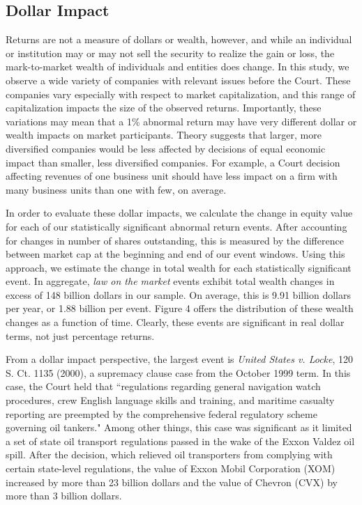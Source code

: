 \documentclass[preprint,12pt]{elsarticle}
\begin{document}
\subsection{Dollar Impact}
Returns are not a measure of dollars or wealth, however, and while an individual or institution may or may not sell the security to realize the gain or loss, the mark-to-market wealth of individuals and entities does change.  In this study, we observe a wide variety of companies with relevant issues before the Court. These companies vary especially with respect to market capitalization, and this range of capitalization impacts the size of the observed returns.  Importantly, these variations may mean that a 1\% abnormal return may have very different dollar or wealth impacts on market participants.  Theory suggests that larger, more diversified companies would be less affected by decisions of equal economic impact than smaller, less diversified companies.  For example, a Court decision affecting revenues of one business unit should have less impact on a firm with many business units than one with few, on average.  

In order to evaluate these dollar impacts, we calculate the change in equity value for each of our statistically significant abnormal return events.  After accounting for changes in number of shares outstanding, this is measured by the difference between market cap at the beginning and end of our event windows.  Using this approach, we estimate the change in total wealth for each statistically significant event. In aggregate, \textit{law on the market} events exhibit total wealth changes in excess of 148 billion dollars in our sample.  On average, this is 9.91 billion dollars per year, or 1.88 billion per event.  Figure 4 offers the distribution of these wealth changes as a function of time.  Clearly, these events are significant in real dollar terms, not just percentage returns.

From a dollar impact perspective, the largest event is \textit{United States v. Locke}, 120 S. Ct. 1135 (2000), a supremacy clause case from the October 1999 term.  In this case, the Court held that ``regulations regarding general navigation watch procedures, crew English language skills and training, and maritime casualty reporting are preempted by the comprehensive federal regulatory scheme governing oil tankers." Among other things, this case was significant as it limited a set of state oil transport regulations passed in the wake of the Exxon Valdez oil spill. After the decision, which relieved oil transporters from complying with certain state-level regulations,  the value of Exxon Mobil Corporation (XOM) increased by more than 23 billion dollars and the value of Chevron (CVX) by more than 3 billion dollars.
\end{document}
